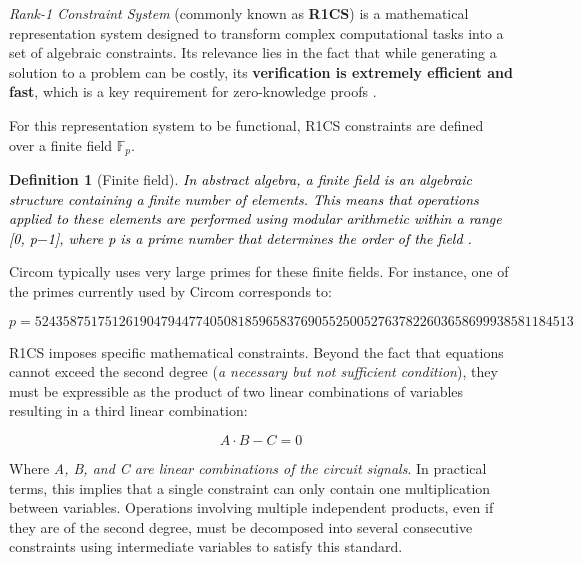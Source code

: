 \documentclass[a4paper,12pt]{report}
\newtheorem{definition}{Definition}
\begin{document}
	\noindent \textit{Rank-1 Constraint System} (commonly known as \textbf{R1CS}) is a mathematical representation system designed to transform complex computational tasks into a set of algebraic constraints. Its relevance lies in the fact that while generating a solution to a problem can be costly, its \textbf{verification is extremely efficient and fast}, which is a key requirement for zero-knowledge proofs \cite{R1CS_cita}.
	
	\vspace{0.25cm}
	\noindent For this representation system to be functional, R1CS constraints are defined over a finite field $\mathbb{F}_p$.
	
	\vspace{0.25cm}
	\noindent 
	
	\begin{definition}[Finite field]
		\textcolor{black}{In abstract algebra, a finite field is an algebraic structure containing a finite number of elements. This means that operations applied to these elements are performed using modular arithmetic within a range [0, p$-$1], where p is a prime number that determines the order of the field \cite{wikipedia_cuerpo_finito}.}
		
		\label{def:cuerpo-finito-ingles}
	\end{definition}
	
	\vspace{0.25cm}
	\noindent Circom typically uses very large primes for these finite fields. For instance, one of the primes currently used by Circom corresponds to:
	
	{\small
		\begin{equation*}
			p = 52435875175126190479447740508185965837690552500527637822603658699938581184513
	\end{equation*}}
	
	\vspace{0.25cm}
	\noindent R1CS imposes specific mathematical constraints. Beyond the fact that equations cannot exceed the second degree (\textit{a necessary but not sufficient condition}), they must be expressible as the product of two linear combinations of variables resulting in a third linear combination:
	
	\begin{equation*}
		A \cdot B - C = 0
	\end{equation*}
	
	\noindent Where \textit{A, B, and C are linear combinations of the circuit signals}. In practical terms, this implies that a single constraint can only contain one multiplication between variables. Operations involving multiple independent products, even if they are of the second degree, must be decomposed into several consecutive constraints using intermediate variables to satisfy this standard.
	
\end{document}
